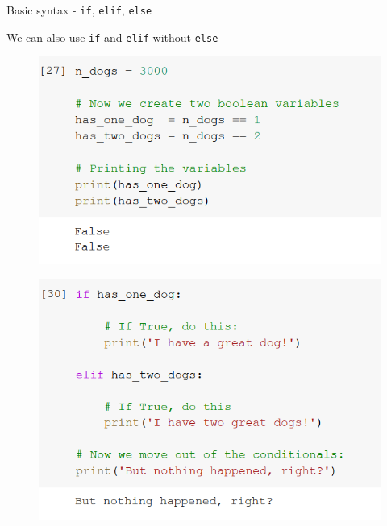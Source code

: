 \documentclass[aspectratio=169]{beamer}
\begin{document}
\begin{frame}{Basic syntax - \texttt{if}, \texttt{elif}, \texttt{else}}

	We can also use \texttt{if} and \texttt{elif} without \texttt{else}

	\begin{multicols}{2}

		\begin{figure}
			\centering
			\includegraphics[width=\linewidth]{img/boolean_variables.png}
		\end{figure}
		\begin{figure}
			\centering
			\includegraphics[width=\linewidth]{img/if_elif.png}
		\end{figure}

	\end{multicols}

\end{frame}
\end{document}
